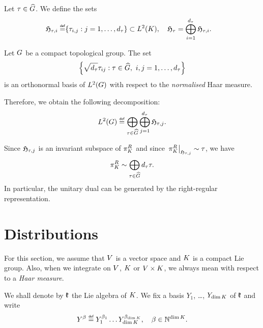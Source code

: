\begin{definition}
    Let $\tau \in {\widehat{G}}$.
    We define the sets
    \begin{align*}
        \HilbertCompactGroupColumn{\tau}{i} \defeq \span \{ \tau_{i, j} : j = 1, \dots, \dimRep\tau \}
        \subset \Lebesgue{2}\CompactGroup, \quad
        \HilbertCompactGroup{\tau} = \bigoplus_{i = 1}^\dimRep\tau \HilbertCompactGroupColumn{\tau}{i}.
    \end{align*}
\end{definition}

\begin{theorem}
\label{theorem:Peter-Weyl_theorem}
    Let $G$ be a compact topological group.
    The set
    \begin{align*}
        \left\{
            \sqrt{\dimRep\tau} \tau_{ij} : \tau \in \dualGroup\Group,\ i, j = 1, \dots, \dimRep\tau
        \right\}
    \end{align*}
    is an orthonormal basis of ${L^{2} (G)}$ with respect to the \emph{normalised} Haar measure.

    Therefore, we obtain the following decomposition:
    \begin{align*}
        \Lebesgue{2}{\Group} \defeq
        \bigoplus_{\tau \in \dualGroup\Group} \bigoplus_{j = 1}^{\dimRep \tau} \Hilbert{\tau}{j}.
    \end{align*}

    Since $\mathfrak{H}_{\tau, j}$ is an invariant subspace of $\pi^R_{K}$
    and since $\left. \pi^R_{K} \right|_{\mathfrak{H}_{\tau, j}} \sim \tau$,
    we have
    \begin{align*}
        \pi^R_{K} \sim
        \bigoplus_{\tau \in {\widehat{G}}} {d_{\tau}} \tau.
    \end{align*}
    In particular, the unitary dual can be generated by the right-regular representation.
\end{theorem}

\section{Distributions}

For this section,
we assume that $V$ is a vector space
and $K$ is a compact Lie group.
Also, when we integrate on $V$, $K$ or $V \times K$,
we always mean with respect to a \emph{Haar measure}.

We shall denote by $\mathfrak{k}$ the Lie algebra of $K$.
We fix a basis $Y_1$, \dots, $Y_{\dim K}$ of $\mathfrak{k}$ and write
\begin{align*}
    Y^\beta \defeq Y_1^{\beta_1} \dots Y_{\dim \CompactGroup}^{\beta_{\dim \CompactGroup}},
    \quad \beta \in \N^{\dim \CompactGroup}.
\end{align*}

